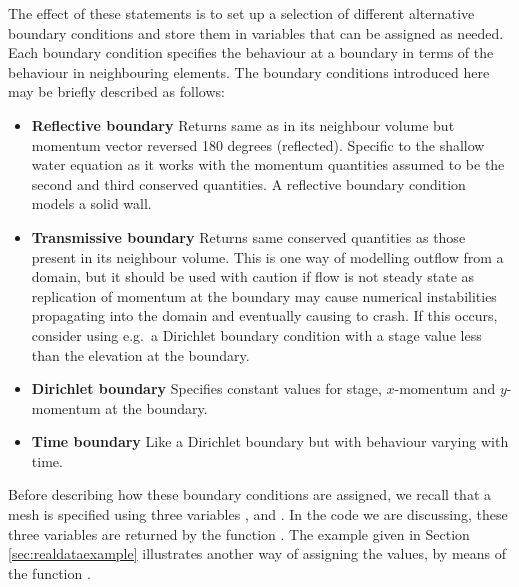 \documentclass{manual}
\begin{document}
The effect of these statements is to set up a selection of different
alternative boundary conditions and store them in variables that can be
assigned as needed. Each boundary condition specifies the
behaviour at a boundary in terms of the behaviour in neighbouring
elements. The boundary conditions introduced here may be briefly described as
follows:
\begin{itemize}
    \item \textbf{Reflective boundary}\label{def:reflective boundary}
          Returns same  as in its neighbour volume but momentum
          vector reversed 180 degrees (reflected).
          Specific to the shallow water equation as it works with the
          momentum quantities assumed to be the second and third conserved
          quantities. A reflective boundary condition models a solid wall.
    \item \textbf{Transmissive boundary}\label{def:transmissive boundary} 
          Returns same conserved quantities as
          those present in its neighbour volume. This is one way of modelling
          outflow from a domain, but it should be used with caution if flow is
          not steady state as replication of momentum at the boundary
          may cause numerical instabilities propagating into the domain and 
          eventually causing \anuga to crash. If this occurs,
          consider using e.g.\ a Dirichlet boundary condition with a stage value 
          less than the elevation at the boundary.
    \item \textbf{Dirichlet boundary}\label{def:dirichlet boundary} Specifies
          constant values for stage, $x$-momentum and $y$-momentum at the boundary.
    \item \textbf{Time boundary}\label{def:time boundary} Like a Dirichlet
          boundary but with behaviour varying with time.
\end{itemize}

\label{ref:tagdescription}Before describing how these boundary
conditions are assigned, we recall that a mesh is specified using
three variables ,  and .
In the code we are discussing, these three variables are returned by
the function . The example given in
Section \ref{sec:realdataexample} illustrates another way of
assigning the values, by means of the function
.
\end{document}
